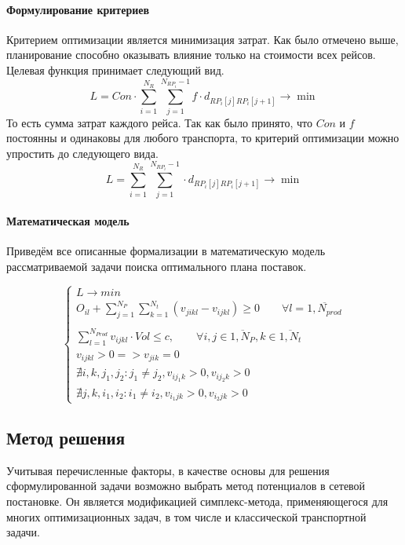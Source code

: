 	\paragraph{Формулирование критериев}   
	Критерием оптимизации является минимизация затрат. Как было отмечено выше, планирование способно оказывать влияние только на стоимости всех рейсов. Целевая функция принимает следующий вид.
	\begin{equation}
		L = Con \cdot \sum_{i=1}^{N_R} \sum_{j=1}^{N_{RP_i} - 1} f \cdot d_{RP_i[j] RP_i[j+1]} \to \min
	\end{equation}
	То есть сумма затрат каждого рейса. Так как было принято, что $Con$ и $f$ постоянны и одинаковы для любого транспорта, то критерий оптимизации можно упростить до следующего вида.
	\begin{equation}
		L = \sum_{i=1}^{N_R} \sum_{j=1}^{N_{RP_i} - 1} \cdot d_{RP_i[j] RP_i[j+1]} \to \min
	\end{equation}

	\paragraph{Математическая модель}
	Приведём все описанные формализации в математическую модель рассматриваемой задачи поиска оптимального плана поставок.

	\begin{equation}
	\left\{ \begin{array}{ccc}	
		L \to min \\
		O_{il} + \sum_{j=1}^{N_P} \sum_{k=1}^{N_t} (v_{jikl} - v_{ijkl}) \ge 0 \qquad  \forall l = \overline{1, N_{prod}} \\
		\\
		\sum_{l=1}^{N_{Prod}} v_{ijkl} \cdot Vol \le c, \qquad \forall i, j \in \overline{1, N_P}, k \in \overline{1, N_t} \\
		v_{ijkl} > 0 => v_{jik} = 0 \\
		\nexists i, k, j_1, j_2: j_1 \ne j_2, v_{ij_1k} > 0, v_{ij_2k} > 0 \\
		\nexists j, k, i_1, i_2: i_1 \ne i_2, v_{i_1jk} > 0, v_{i_2jk} > 0 
	\end{array}	\right.
	\end{equation}

\subsection{Метод решения}
	Учитывая перечисленные факторы, в качестве основы для решения сформулированной задачи возможно выбрать метод потенциалов в сетевой постановке. Он является модификацией симплекс-метода, применяющегося для многих оптимизационных задач, в том числе и классической транспортной задачи\cite{trans:potential}.
		
